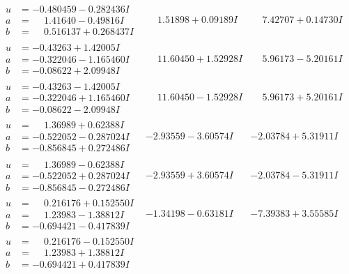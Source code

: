 \documentclass[1p]{elsarticle_modified}
\theoremstyle{definition}
\begin{document}
$$\begin{array}{c|c|c}
 \hline 
\begin{aligned}
u &= -0.480459 - 0.282436 I \\
a &= \phantom{-}1.41640 - 0.49816 I \\
b &= \phantom{-}0.516137 + 0.268437 I\end{aligned}
 & \phantom{-}1.51898 + 0.09189 I & \phantom{-}7.42707 + 0.14730 I \\ \hline\begin{aligned}
u &= -0.43263 + 1.42005 I \\
a &= -0.322046 - 1.165460 I \\
b &= -0.08622 + 2.09948 I\end{aligned}
 & \phantom{-}11.60450 + 1.52928 I & \phantom{-}5.96173 - 5.20161 I \\ \hline\begin{aligned}
u &= -0.43263 - 1.42005 I \\
a &= -0.322046 + 1.165460 I \\
b &= -0.08622 - 2.09948 I\end{aligned}
 & \phantom{-}11.60450 - 1.52928 I & \phantom{-}5.96173 + 5.20161 I \\ \hline\begin{aligned}
u &= \phantom{-}1.36989 + 0.62388 I \\
a &= -0.522052 - 0.287024 I \\
b &= -0.856845 + 0.272486 I\end{aligned}
 & -2.93559 - 3.60574 I & -2.03784 + 5.31911 I \\ \hline\begin{aligned}
u &= \phantom{-}1.36989 - 0.62388 I \\
a &= -0.522052 + 0.287024 I \\
b &= -0.856845 - 0.272486 I\end{aligned}
 & -2.93559 + 3.60574 I & -2.03784 - 5.31911 I \\ \hline\begin{aligned}
u &= \phantom{-}0.216176 + 0.152550 I \\
a &= \phantom{-}1.23983 - 1.38812 I \\
b &= -0.694421 - 0.417839 I\end{aligned}
 & -1.34198 - 0.63181 I & -7.39383 + 3.55585 I \\ \hline\begin{aligned}
u &= \phantom{-}0.216176 - 0.152550 I \\
a &= \phantom{-}1.23983 + 1.38812 I \\
b &= -0.694421 + 0.417839 I\end{aligned}

\end{array}$$
\end{document}
